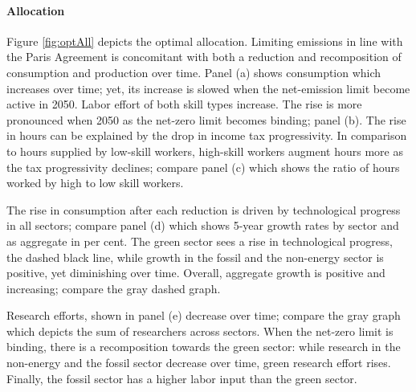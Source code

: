 \paragraph{Allocation}
Figure \ref{fig:optAll} depicts the optimal allocation. Limiting emissions in line with the Paris Agreement is concomitant with both a reduction and recomposition of consumption and production over time. 
Panel (a) shows consumption which increases over time; yet, its increase is slowed when the net-emission limit become active in  2050. Labor effort of both skill types increase. The rise is more pronounced when 2050 as the net-zero limit becomes binding; panel (b). The rise in hours can be explained by the drop in income tax progressivity. In comparison to hours supplied by low-skill workers, high-skill workers augment hours more as the tax progressivity declines; compare panel (c) which shows the ratio of hours worked by high to low skill workers. 

The rise in consumption after each reduction is driven by technological progress in all sectors; compare panel (d) which shows 5-year growth rates by sector and as aggregate in per cent. 
The green sector sees a rise in technological progress, the dashed black line, while growth in the fossil and the non-energy sector is positive, yet diminishing over time. Overall, aggregate growth is positive and increasing; compare the gray dashed graph. 

Research efforts, shown in panel (e) decrease over time; compare the gray graph which depicts the sum of researchers across sectors. When the net-zero limit is binding, there is a recomposition towards the green sector: while research in the non-energy and the fossil sector decrease over time, green research effort rises. 
Finally, the fossil sector has a higher labor input than the green sector. 

